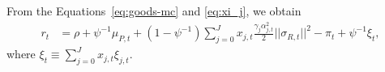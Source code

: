 
From the Equations~\eqref{eq:goods-mc} and \eqref{eq:xi_j}, we obtain
\begin{align}\label{eq:interest_rate}
	r_t  &  =  \rho  +\psi^{-1} \mu_{P,t} + \left (1-\psi^{-1}\right )  \sum_{j=0}^J x_{j,t}\frac{\gamma_j \alpha_{j,t}^2}{2} ||\sigma_{R,t}||^2- \pi_t +\psi^{-1} \xi_t,
\end{align}
where $\xi_t \equiv \sum_{j=0}^J x_{j,t} \xi_{j,t}$.

